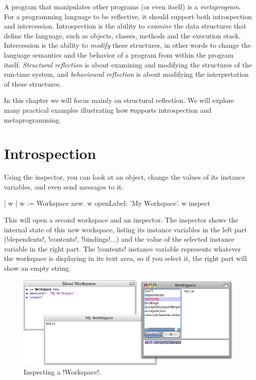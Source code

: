 \documentclass[a4paper,10pt,twoside]{book}
\begin{document}
A program that manipulates other programs (or even itself) is a \emph{metaprogram}.
For a programming language to be reflective, it should support both introspection and intercession.
Introspection is the ability to \emph{examine} the data structures that define the language, such as objects, classes, methods and the execution stack.
Intercession is the ability to \emph{modify} these structures, in other words to change the language semantics and the behavior of a program from within the program itself.
\emph{Structural reflection} is about examining and modifying the structures of the run-time system, and \emph{behavioural reflection} is about modifying the interpretation of these structures.

In this chapter we will focus mainly on structural reflection.
We will explore many practical examples illustrating how \st supports introspection and metaprogramming.

\section{Introspection}

Using the inspector, you can look at an object, change the values of its instance variables, and even send messages to it.

\begin{code}{| w |}
w := Workspace new.
w openLabel: 'My Workspace'.
w inspect
\end{code}

This will open a second workspace and an inspector.
The inspector shows the internal state of this new workspace, listing its instance variables in the left part (\ct!dependents!, \ct!contents!, \ct!bindings!...) and the value of the selected instance variable in the right part.
The \ct!contents! instance variable represents whatever the workspace is displaying in its text area, so if you select it, the right part will show an empty string.

\begin{figure}[ht]\centering
	\includegraphics[width=\linewidth]{workspaceInspector}
	\caption{Inspecting a \ct!Workspace!.\label{fig:workspaceInspector}}
\end{figure}
\end{document}
